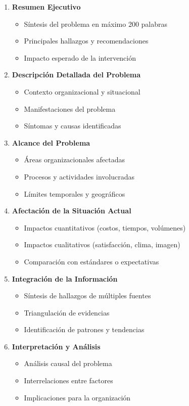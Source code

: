 \documentclass[12pt,letterpaper,oneside]{book}
\begin{document}
\begin{enumerate}
\item \textbf{Resumen Ejecutivo}
   \begin{itemize}
   \item Síntesis del problema en máximo 200 palabras
   \item Principales hallazgos y recomendaciones
   \item Impacto esperado de la intervención
   \end{itemize}

\item \textbf{Descripción Detallada del Problema}
   \begin{itemize}
   \item Contexto organizacional y situacional
   \item Manifestaciones del problema
   \item Síntomas y causas identificadas
   \end{itemize}

\item \textbf{Alcance del Problema}
   \begin{itemize}
   \item Áreas organizacionales afectadas
   \item Procesos y actividades involucradas
   \item Límites temporales y geográficos
   \end{itemize}

\item \textbf{Afectación de la Situación Actual}
   \begin{itemize}
   \item Impactos cuantitativos (costos, tiempos, volúmenes)
   \item Impactos cualitativos (satisfacción, clima, imagen)
   \item Comparación con estándares o expectativas
   \end{itemize}

\item \textbf{Integración de la Información}
   \begin{itemize}
   \item Síntesis de hallazgos de múltiples fuentes
   \item Triangulación de evidencias
   \item Identificación de patrones y tendencias
   \end{itemize}

\item \textbf{Interpretación y Análisis}
   \begin{itemize}
   \item Análisis causal del problema
   \item Interrelaciones entre factores
   \item Implicaciones para la organización
   \end{itemize}
\end{enumerate}
\end{document}
